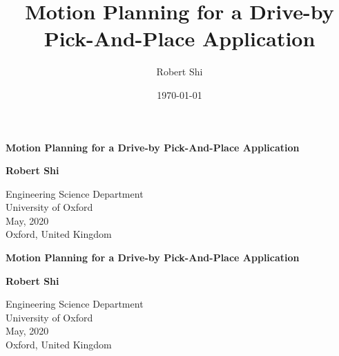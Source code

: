 \documentclass[12pt]{article}
\title{Motion Planning for a Drive-by Pick-And-Place Application}
\author{Robert Shi}
\date{\today}
\begin{document}
\begin{titlepage}
    \centering
    \vspace*{1cm}
    \LARGE
    \textbf{Motion Planning for a Drive-by Pick-And-Place Application}

    \vspace{2.5cm}
    \textbf{Robert Shi}

    \vfill
        \Large
        Engineering Science Department\\
        University of Oxford\\
        May, 2020\\
        Oxford, United Kingdom\\
        \vspace{2.0cm}
\end{titlepage}
\begin{titlepage}
    \centering
    \vspace*{1cm}
    \LARGE
    \textbf{Motion Planning for a Drive-by Pick-And-Place Application}

    \vspace{2.5cm}
    \textbf{Robert Shi}

    \vfill
        \Large
        Engineering Science Department\\
        University of Oxford\\
        May, 2020\\
        Oxford, United Kingdom\\
        \vspace{2.0cm}
\end{titlepage}
\newpage
\end{document}
